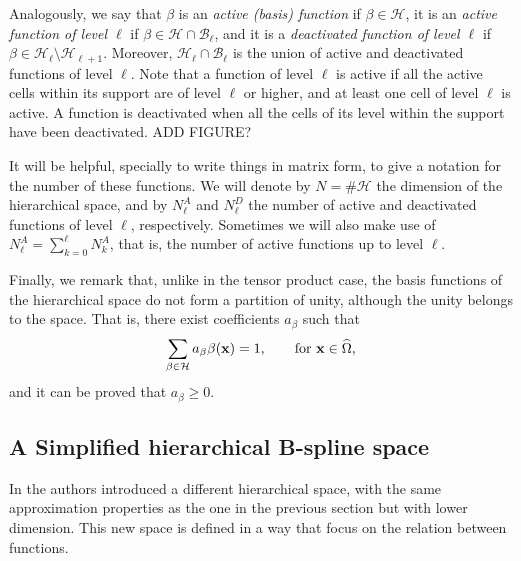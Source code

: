 \documentclass[a4paper]{siamltex1213}
\newcommand{\Rd}{\color{red}}
\renewcommand{\Rd}{\color{black}}
\newcommand\BB{\mathcal B}
\newcommand\HH{\mathcal H}
\newcommand{\bx}{{\bf x}}
\let\hat\widehat
\begin{document}
Analogously, we say that $\beta$ is an \emph{active (basis) function} if $\beta\in\HH$, it is an \emph{active function of level $\ell$} if $\beta \in \HH \cap \BB_\ell$, and it is a \emph{deactivated function of level $\ell$} if $\beta \in \HH_\ell \setminus \HH_{\ell+1}$. Moreover, $\HH_\ell \cap \BB_\ell$ is the union of active and deactivated functions of level $\ell$. Note that a function of level $\ell$ is active if all the active cells within its support are of level $\ell$ or higher, and at least one cell of level $\ell$ is active. A function is deactivated when all the cells of its level within the support have been deactivated.
{\Rd ADD FIGURE?}

It will be helpful, specially to write things in matrix form, to give a notation for the number of these functions. We will denote by $N= \# \HH$ the dimension of the hierarchical space, and by $N^A_\ell$ and $N^D_\ell$ the number of active and deactivated functions of level $\ell$, respectively. Sometimes we will also make use of {\Rd $N^A_\ell = \sum_{k=0}^\ell N_k^A$}, that is, the number of active functions up to level $\ell$.


Finally, we remark that, unlike in the tensor product case, the basis functions of the hierarchical space do not form a partition of unity, although the unity belongs to the space. That is, there exist coefficients $a_\beta$ such that 
 \begin{equation}\label{E:partition of the unity in the hierarchical space}
\sum_{\beta\in {\HH}} a_\beta \beta (\bx) = 1, \qquad\text{for } \bx \in \hat \Omega,
\end{equation}
and it can be proved that $a_\beta \ge 0$. 


\subsection{A {\Rd Simplified} hierarchical B-spline space}
In \cite{BG15} the authors introduced a different hierarchical space, with the same approximation properties as the one in the previous section but with lower dimension. This new space is defined in a way that focus on the relation between functions. 
\end{document}
